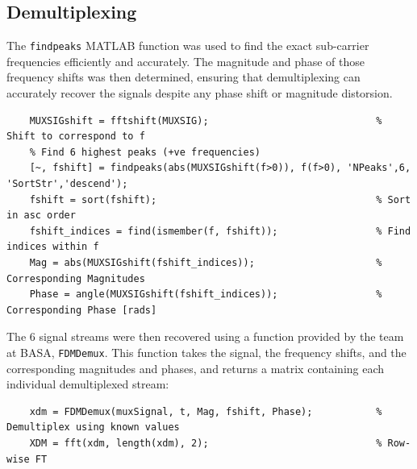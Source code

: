 \documentclass[12pt]{article}
\numberwithin{equation}{section}
\numberwithin{figure}{section}
\numberwithin{table}{section}
\begin{document}
\subsection{Demultiplexing}\label{sec:p3-demultiplexing}
The \verb+findpeaks+ MATLAB function was used to find the exact sub-carrier
frequencies efficiently and accurately. The magnitude and phase of those
frequency shifts was then determined, ensuring that demultiplexing can
accurately recover the signals despite any phase shift or magnitude distorsion.
\begin{verbatim}
    MUXSIGshift = fftshift(MUXSIG);                             % Shift to correspond to f
    % Find 6 highest peaks (+ve frequencies)
    [~, fshift] = findpeaks(abs(MUXSIGshift(f>0)), f(f>0), 'NPeaks',6, 'SortStr','descend'); 
    fshift = sort(fshift);                                      % Sort in asc order
    fshift_indices = find(ismember(f, fshift));                 % Find indices within f
    Mag = abs(MUXSIGshift(fshift_indices));                     % Corresponding Magnitudes
    Phase = angle(MUXSIGshift(fshift_indices));                 % Corresponding Phase [rads]    
\end{verbatim}

The 6 signal streams were then recovered using a function provided by the team
at BASA, \verb+FDMDemux+. This function takes the signal, the frequency shifts,
and the corresponding magnitudes and phases, and returns a matrix containing
each individual demultiplexed stream:

\begin{verbatim}
    xdm = FDMDemux(muxSignal, t, Mag, fshift, Phase);           % Demultiplex using known values
    XDM = fft(xdm, length(xdm), 2);                             % Row-wise FT
\end{verbatim}
\end{document}
